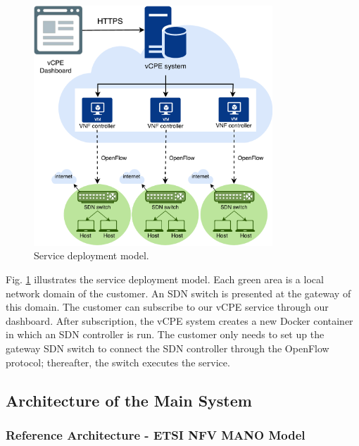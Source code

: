 \begin{figure}[!t]
\centering
\includegraphics[width=0.8\textwidth]{./fig/hsnl_service_deployment}
\caption{Service deployment model.}
\label{fig:hsnl_service_deployment}
\end{figure}

Fig. \ref{fig:hsnl_service_deployment} illustrates the service deployment model. Each green area is a local network domain of the customer. An SDN switch is presented at the gateway of this domain. The customer can subscribe to our vCPE service through our dashboard. After subscription, the vCPE system creates a new Docker container in which an SDN controller is run. The customer only needs to set up the gateway SDN switch to connect the SDN controller through the OpenFlow protocol; thereafter, the switch executes the service.


\subsection{Architecture of the Main System}
\subsubsection{Reference Architecture - ETSI NFV MANO Model}

